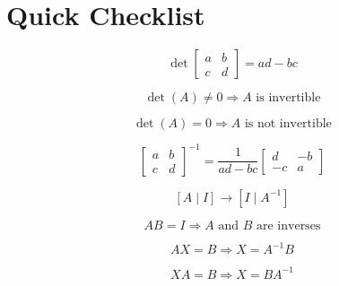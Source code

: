 \documentclass[11pt]{article}
\begin{document}
\section*{Quick Checklist}

\[
\det
\begin{bmatrix}
a & b\\
c & d
\end{bmatrix}
=ad-bc
\]

\[
\det(A)\ne0 \Rightarrow A \text{ is invertible}
\]

\[
\det(A)=0 \Rightarrow A \text{ is not invertible}
\]

\[
\begin{bmatrix}
a & b\\
c & d
\end{bmatrix}^{-1}
=
\frac{1}{ad-bc}
\begin{bmatrix}
d & -b\\
-c & a
\end{bmatrix}
\]

\[
[A\mid I]\rightarrow[I\mid A^{-1}]
\]

\[
AB=I \Rightarrow A \text{ and } B \text{ are inverses}
\]

\[
AX=B \Rightarrow X=A^{-1}B
\]

\[
XA=B \Rightarrow X=BA^{-1}
\]
\end{document}
